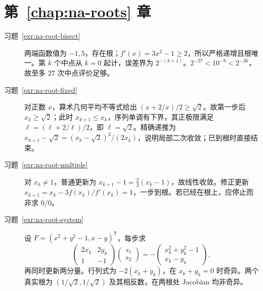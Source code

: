 \section{第~\ref{chap:na-roots} 章}
\begin{description}
\item[习题~\ref{exr:na-root-bisect}] 两端函数值为 $-1,5$，存在根；$f'(x)=3x^2-1\ge2$，所以严格递增且根唯一。第 $k$ 个中点从 $k=0$ 起计，误差界为 $2^{-(k+1)}$。$2^{-27}<10^{-8}<2^{-26}$，故至多 $27$ 次中点评价足够。
\item[习题~\ref{exr:na-root-fixed}] 对正数 $x$，算术几何平均不等式给出 $(x+2/x)/2\ge\sqrt2$。故第一步后 $x_k\ge\sqrt2$；此时 $x_{k+1}\le x_k$，序列单调有下界，其正极限满足 $\ell=(\ell+2/\ell)/2$，即 $\ell=\sqrt2$。精确递推为 $x_{k+1}-\sqrt2=(x_k-\sqrt2)^2/(2x_k)$，说明局部二次收敛；已到根时直接结束。
\item[习题~\ref{exr:na-root-multiple}] 对 $x_k\ne1$，普通更新为 $x_{k+1}-1=\tfrac23(x_k-1)$，故线性收敛。修正更新 $x_{k+1}=x_k-3f(x_k)/f'(x_k)=1$，一步到根。若已经在根上，应停止而非求 $0/0$。
\item[习题~\ref{exr:na-root-system}] 设 $F=(x^2+y^2-1,x-y)^{\mathsf T}$，每步求
\[
 \begin{pmatrix}2x_k&2y_k\\1&-1\end{pmatrix}
 \begin{pmatrix}s_1\\s_2\end{pmatrix}
 =-\begin{pmatrix}x_k^2+y_k^2-1\\x_k-y_k\end{pmatrix},
\]
再同时更新两分量。行列式为 $-2(x_k+y_k)$，在 $x_k+y_k=0$ 时奇异。两个真实根为 $(1/\sqrt2,1/\sqrt2)$ 及其相反数，在两根处 Jacobian 均非奇异。
\end{description}

